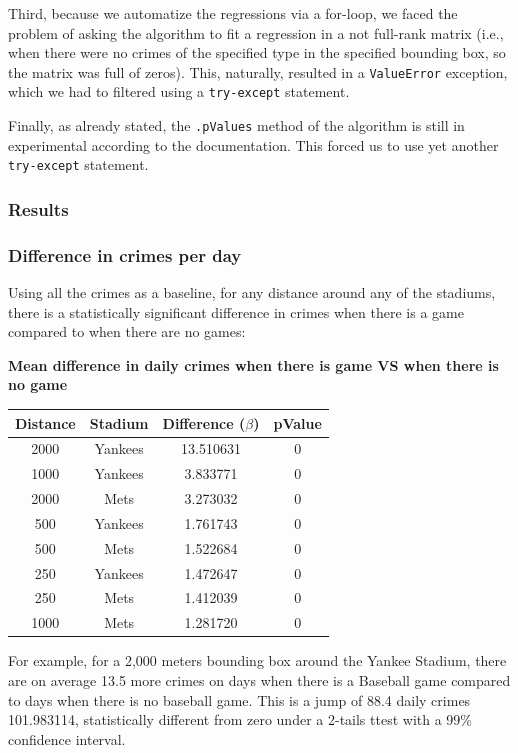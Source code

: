 \documentclass{article}
\begin{document}
Third, because we automatize the regressions via a for-loop, we faced the problem of asking the algorithm to fit a regression in a not full-rank matrix (i.e., when there were no crimes of the specified type in the specified bounding box, so the matrix was full of zeros). This, naturally, resulted in a \texttt{ValueError} exception, which we had to filtered using a  \texttt{try-except} statement. 

Finally, as already stated, the \texttt{.pValues} method of the algorithm is still in experimental according to the documentation. This forced us to use yet another \texttt{try-except} statement.  

\subsubsection{Results}

\subsubsection*{Difference in crimes per day}

Using all the crimes as a baseline, for any distance around any of the stadiums, there is a statistically significant difference in crimes when there is a game compared to when there are no games: 

\begin{center}
\textbf{Mean difference in daily crimes when there is game VS when there is no game} 
\medskip

\begin{tabular}{ |c|c|c|c| } 
\hline
\textbf{Distance} & \textbf{Stadium} & \textbf{Difference ($\beta$)} & \textbf{pValue} \\
\hline
   2000 & Yankees & 13.510631 & 0\\ 
   1000 & Yankees & 3.833771 & 0\\ 
   2000 & Mets  & 3.273032 & 0\\ 
   500 & Yankees & 1.761743 & 0 \\ 
   500 &   Mets & 1.522684 & 0\\ 
   250 & Yankees & 1.472647 & 0 \\ 
   250 & Mets & 1.412039 & 0\\ 
   1000 & Mets & 1.281720 & 0\\ 
\hline 
\end{tabular}
\end{center}
\medskip

For example, for a 2,000 meters bounding box around the Yankee Stadium, there are on average 13.5 more crimes on days when there is a Baseball game compared to days when there is no baseball game. This is a jump of 88.4 daily crimes 101.983114, statistically different from zero under a 2-tails ttest with a 99\% confidence interval. 
\end{document}
